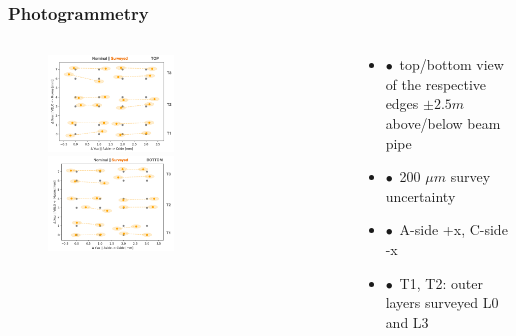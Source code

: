 \documentclass[aspectratio=1610, 12pt, xcolor=dvipsnames]{beamer}
\begin{document}
\begin{frame}\frametitle{Photogrammetry}
  \begin{columns}
    \begin{column}[c]{0.48\textwidth}
      \begin{figure}
        \includegraphics[width=0.5\textwidth]{plots/survey_top.png}
        \includegraphics[width=0.5\textwidth]{plots/survey_bottom.png}
      \end{figure}
    \end{column}
    \begin{column}[c]{0.48\textwidth}
      \begin{itemize}
        \item $\bullet$\, top/bottom view of the respective edges $\pm 2.5m$ above/below beam pipe
        \item $\bullet$\, 200 $\mu m$ survey uncertainty
        \item $\bullet$\, A-side \to +x, C-side \to -x
        \item $\bullet$\, T1, T2: outer layers surveyed \to L0 and L3
      \end{itemize}
    \end{column}
  \end{columns}
\end{frame}
\end{document}

